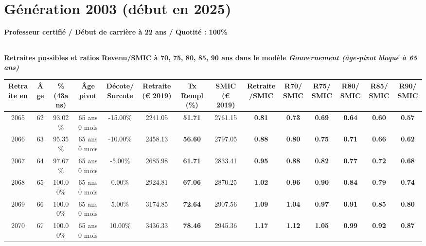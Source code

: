 \newpage 
 
\section{Génération 2003 (début en 2025)\label{ProfCertifie_100_22_2003_0}} 
 
{\bf \noindent Professeur certifié / Début de carrière à 22 ans / Quotité : 100\%}  ~ 

 ~\\{\bf \noindent Retraites possibles et ratios Revenu/SMIC à 70, 75, 80, 85, 90 ans dans le modèle \emph{Gouvernement (âge-pivot bloqué à 65 ans)}}  
 
\begin{adjustbox}{max width=\textwidth} 
\begin{tabular}[htb]{|c|c||c|c|c||c|c||c|c||c|c|c|c|c|} 
\hline 
 Retraite en &  Âge &  \%(43ans) &  Âge pivot &  Décote/Surcote &  Retraite (\euro{} 2019) &  Tx Rempl(\%) &  SMIC (\euro{} 2019) &  Retraite/SMIC &  R70/SMIC &  R75/SMIC &  R80/SMIC &  R85/SMIC &  R90/SMIC \\ 
\hline \hline 
 2065 &  62 &  93.02\% &  65 ans 0 mois &  -15.00\% &  2241.05 &  {\bf 51.71} &  2761.15 &  {\bf {\color{red} 0.81}} &  {\bf {\color{red} 0.73}} &  {\bf {\color{red} 0.69}} &  {\bf {\color{red} 0.64}} &  {\bf {\color{red} 0.60}} &  {\bf {\color{red} 0.57}} \\ 
\hline 
 2066 &  63 &  95.35\% &  65 ans 0 mois &  -10.00\% &  2458.13 &  {\bf 56.60} &  2797.05 &  {\bf {\color{red} 0.88}} &  {\bf {\color{red} 0.80}} &  {\bf {\color{red} 0.75}} &  {\bf {\color{red} 0.71}} &  {\bf {\color{red} 0.66}} &  {\bf {\color{red} 0.62}} \\ 
\hline 
 2067 &  64 &  97.67\% &  65 ans 0 mois &  -5.00\% &  2685.98 &  {\bf 61.71} &  2833.41 &  {\bf {\color{red} 0.95}} &  {\bf {\color{red} 0.88}} &  {\bf {\color{red} 0.82}} &  {\bf {\color{red} 0.77}} &  {\bf {\color{red} 0.72}} &  {\bf {\color{red} 0.68}} \\ 
\hline 
 2068 &  65 &  100.00\% &  65 ans 0 mois &  0.00\% &  2924.81 &  {\bf 67.06} &  2870.25 &  {\bf 1.02} &  {\bf {\color{red} 0.96}} &  {\bf {\color{red} 0.90}} &  {\bf {\color{red} 0.84}} &  {\bf {\color{red} 0.79}} &  {\bf {\color{red} 0.74}} \\ 
\hline 
 2069 &  66 &  100.00\% &  65 ans 0 mois &  5.00\% &  3174.85 &  {\bf 72.64} &  2907.56 &  {\bf 1.09} &  {\bf 1.04} &  {\bf {\color{red} 0.97}} &  {\bf {\color{red} 0.91}} &  {\bf {\color{red} 0.85}} &  {\bf {\color{red} 0.80}} \\ 
\hline 
 2070 &  67 &  100.00\% &  65 ans 0 mois &  10.00\% &  3436.33 &  {\bf 78.46} &  2945.36 &  {\bf 1.17} &  {\bf 1.12} &  {\bf 1.05} &  {\bf {\color{red} 0.99}} &  {\bf {\color{red} 0.92}} &  {\bf {\color{red} 0.87}} \\ 
\hline 
\hline 
\end{tabular} 
\end{adjustbox} 
 
